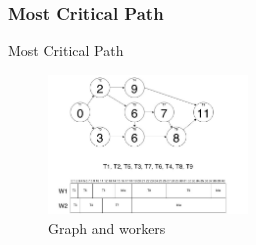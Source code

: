 {{    %

    \subsubsection{Most Critical Path} %
    \label{sub:most_critical_path}


        \begin{frame}{Most Critical Path}{}
        \begin{figure}
            \centering
            \includegraphics[width=200px]{Grafik/GraphA2}
                \caption{Graph and workers}
            \label{MCP}
        \end{figure}
        \end{frame}

}
}